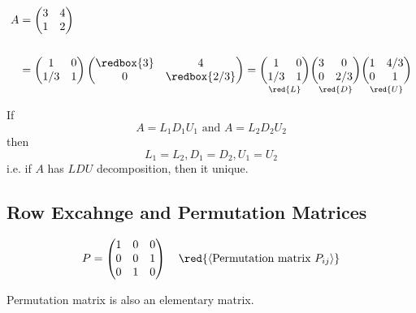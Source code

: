 \begin{eg}
\begin{align*}
    A &= \begin{pmatrix}
        3 & 4 \\
        1 & 2
    \end{pmatrix}\\ \\ &= \begin{pmatrix}
        1 & 0 \\
        1/3 & 1
    \end{pmatrix} \begin{pmatrix}
        \redbox{3} & 4 \\
        0 & \redbox{2/3}
    \end{pmatrix} = \underset{\red{L}}{\begin{pmatrix}
        1 & 0 \\
        1/3 & 1
    \end{pmatrix}} \underset{\red{D}}{\begin{pmatrix}
        3 & 0 \\
        0 & 2/3 
    \end{pmatrix}} \underset{\red{U}}{\begin{pmatrix}
        1 & 4/3 \\
        0 & 1
    \end{pmatrix}}
\end{align*}

\end{eg}

\begin{theorem}\label{thm:1.5.2}
    If \[ A = L_1D_1U_1 \text{ and } A = L_2D_2U_2\]
    then \[L_1 = L_2, D_1 = D_2, U_1 = U_2\]
    i.e. if $A$ has $LDU$ decomposition, then it  unique.
\end{theorem}

\newpage

\subsection{Row Excahnge and Permutation Matrices}
\[
P = \begin{pmatrix}
    1 & 0 & 0 \\
    0 & 0 & 1 \\
    0 & 1 & 0 
\end{pmatrix}
\quad \red{\langle \text{Permutation matrix } P_{ij} \rangle}
\]

\begin{note}
    Permutation matrix is also an elementary matrix.
\end{note}

